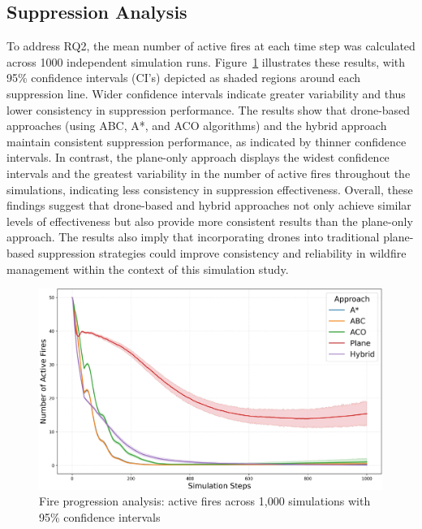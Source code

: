 \documentclass[11pt, a4paper]{article}
\begin{document}
\subsection{Suppression Analysis}
\label{sec:supression_analysis}

To address RQ2, the mean number of active fires at each time step was calculated across 1000 independent simulation runs. Figure~\ref{fig:comparitive_analysislineplot} illustrates these results, with 95\% confidence intervals (CI's) depicted as shaded regions around each suppression line. Wider confidence intervals indicate greater variability and thus lower consistency in suppression performance.
The results show that drone-based approaches (using ABC, A*, and ACO algorithms) and the hybrid approach maintain consistent suppression performance, as indicated by thinner confidence intervals. In contrast, the plane-only approach displays the widest confidence intervals and the greatest variability in the number of active fires throughout the simulations, indicating less consistency in suppression effectiveness.
Overall, these findings suggest that drone-based and hybrid approaches not only achieve similar levels of effectiveness but also provide more consistent results than the plane-only approach. The results also imply that incorporating drones into traditional plane-based suppression strategies could improve consistency and reliability in wildfire management within the context of this simulation study.

\begin{figure}[htbp]
    \centering
    \includegraphics[width=1\linewidth]{figures/fire_progression_analysis.jpeg}
    \caption{Fire progression analysis: active fires across 1,000 simulations with 95\% confidence intervals}
    \label{fig:comparitive_analysislineplot}
\end{figure}
\end{document}

